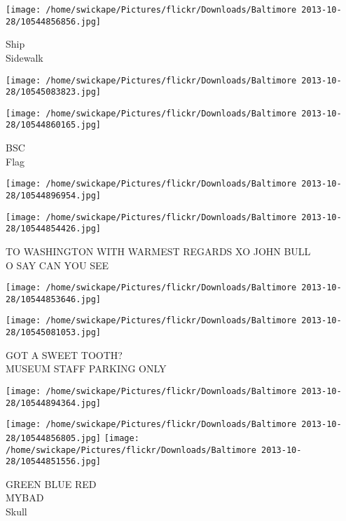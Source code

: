 \documentclass[10pt,letterpaper]{article}
\begin{document}
\vspace{0.25in}
\texttt{[image: /home/swickape/Pictures/flickr/Downloads/Baltimore 2013-10-28/10544856856.jpg]}

Ship\\
Sidewalk\\
\pagebreak

\texttt{[image: /home/swickape/Pictures/flickr/Downloads/Baltimore 2013-10-28/10545083823.jpg]}

\vspace{0.25in}
\texttt{[image: /home/swickape/Pictures/flickr/Downloads/Baltimore 2013-10-28/10544860165.jpg]}

BSC\\
Flag\\
\pagebreak

\texttt{[image: /home/swickape/Pictures/flickr/Downloads/Baltimore 2013-10-28/10544896954.jpg]}

\vspace{0.25in}
\texttt{[image: /home/swickape/Pictures/flickr/Downloads/Baltimore 2013-10-28/10544854426.jpg]}

TO WASHINGTON WITH WARMEST REGARDS XO JOHN BULL\\
O SAY CAN YOU SEE\\
\pagebreak

\texttt{[image: /home/swickape/Pictures/flickr/Downloads/Baltimore 2013-10-28/10544853646.jpg]}

\vspace{0.25in}
\texttt{[image: /home/swickape/Pictures/flickr/Downloads/Baltimore 2013-10-28/10545081053.jpg]}

GOT A SWEET TOOTH?\\
MUSEUM STAFF PARKING ONLY\\
\pagebreak

\texttt{[image: /home/swickape/Pictures/flickr/Downloads/Baltimore 2013-10-28/10544894364.jpg]}

\vspace{0.25in}
\texttt{[image: /home/swickape/Pictures/flickr/Downloads/Baltimore 2013-10-28/10544856805.jpg]}
\texttt{[image: /home/swickape/Pictures/flickr/Downloads/Baltimore 2013-10-28/10544851556.jpg]}

GREEN BLUE RED\\
MYBAD\\
Skull\\
\pagebreak
\end{document}
